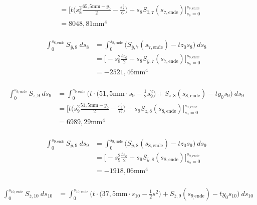 \begin{itemize}
\begin{equation}
\begin{split}
			&=\bigg[t\bigg(s_8^2\frac{65,5\mathrm{mm}-y_0}{2}-\frac{s_8^3}{6}\bigg)+s_8S_{\bar z,7}(s_{7,\mathrm{ende}})\bigg]_{s_8=0}^{s_{8,\mathrm{ende}}}\\\
			&=8048,81\mathrm{mm}^4
		\end{split}
	\end{equation}\\
	\begin{equation}
		\begin{split}
			\int_{0}^{s_{8,\mathrm{ende}}} S_{\bar y,8}\ ds_8 &= \int_{0}^{s_{8,\mathrm{ende}}} \bigg(S_{\bar y,7}(s_{7,\mathrm{ende}})-tz_0s_8\bigg)\ ds_8\\\
			&=\bigg[-s_8^2\frac{tz_0}{2}+s_8S_{\bar y,7}(s_{7,\mathrm{ende}})\bigg]_{s_8=0}^{s_{8,\mathrm{ende}}}\\\
			&=-2521,46\mathrm{mm}^4
		\end{split}
	\end{equation}\\
	\begin{equation}
		\begin{split}
			\int_{0}^{s_{9,\mathrm{ende}}} S_{\bar z,9}\ ds_9 &= \int_{0}^{s_{9,\mathrm{ende}}} \bigg(t\cdot\bigg(51,5\mathrm{mm}\cdot s_9-\frac{1}{2}s^2_9\bigg) + S_{\bar z,8}(s_{8,\mathrm{ende}})-ty_0s_9\bigg)\ ds_9\\\
			&=\bigg[t\bigg(s_9^2\frac{51,5\mathrm{mm}-y_0}{2}-\frac{s_9^3}{6}\bigg)+s_9S_{\bar z,8}(s_{8,\mathrm{ende}})\bigg]_{s_9=0}^{s_{9,\mathrm{ende}}}\\\
			&=6989,29\mathrm{mm}^4
		\end{split}
	\end{equation}\\
	\begin{equation}
		\begin{split}
			\int_{0}^{s_{9,\mathrm{ende}}} S_{\bar y,9}\ ds_9 &= \int_{0}^{s_{9,\mathrm{ende}}} \bigg(S_{\bar y,8}(s_{8,\mathrm{ende}})-tz_0s_9\bigg)\ ds_9\\\
			&=\bigg[-s_9^2\frac{tz_0}{2}+s_9S_{\bar y,8}(s_{8,\mathrm{ende}})\bigg]_{s_9=0}^{s_{9,\mathrm{ende}}}\\\
			&=-1918,06\mathrm{mm}^4
		\end{split}
	\end{equation}\\
	\begin{equation}
		\begin{split}
			\int_{0}^{s_{10,\mathrm{ende}}} S_{\bar z,10}\ ds_{10} &= \int_{0}^{s_{10,\mathrm{ende}}} \bigg(t\cdot\bigg(37,5\mathrm{mm}\cdot s_{10} - \frac{1}{2}s^2\bigg) + S_{\bar z,9}(s_{9_,\mathrm{ende}})-ty_0s_{10}\bigg)\ ds_{10}\\\

\end{split}
\end{equation}
\end{itemize}
